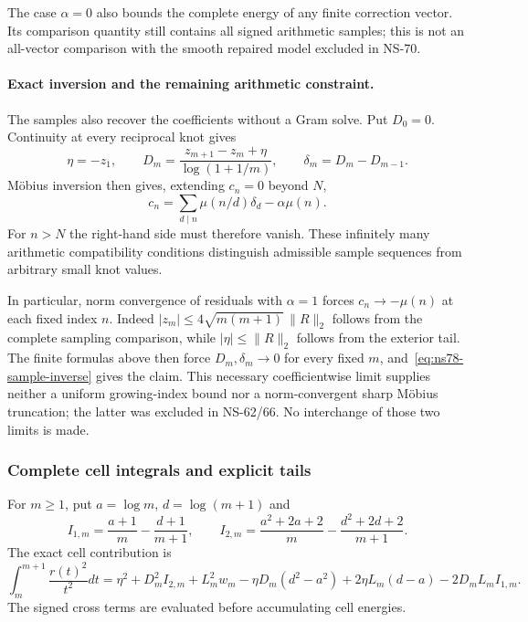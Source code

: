 \documentclass[11pt]{article}
\theoremstyle{remark}
\begin{document}
The case $\alpha=0$ also bounds the complete energy of any finite
correction vector. Its comparison quantity still contains all signed
arithmetic samples; this is not an all-vector comparison with the
smooth repaired model excluded in NS-70.

\paragraph{Exact inversion and the remaining arithmetic constraint.}
The samples also recover the coefficients without a Gram solve. Put
$D_0=0$. Continuity at every reciprocal knot gives
\[
 \eta=-z_1,\qquad
 D_m=\frac{z_{m+1}-z_m+\eta}{\log(1+1/m)},\qquad
 \delta_m=D_m-D_{m-1}.
\]
M\"obius inversion then gives, extending $c_n=0$ beyond $N$,
\begin{equation}
 c_n=\sum_{d\mid n}\mu(n/d)\delta_d-\alpha\mu(n).
 \label{eq:ns78-sample-inverse}
\end{equation}
For $n>N$ the right-hand side must therefore vanish. These infinitely
many arithmetic compatibility conditions distinguish admissible sample
sequences from arbitrary small knot values.

In particular, norm convergence of residuals with $\alpha=1$ forces
$c_n\to-\mu(n)$ at each fixed index $n$. Indeed
$|z_m|\leq4\sqrt{m(m+1)}\,\|R\|_2$ follows from the complete
sampling comparison, while $|\eta|\leq\|R\|_2$ follows from the
exterior tail. The finite formulas above then force $D_m,\delta_m\to0$
for every fixed $m$, and~\eqref{eq:ns78-sample-inverse} gives the claim.
This necessary coefficientwise limit supplies neither a uniform growing-index
bound nor a norm-convergent sharp M\"obius truncation; the latter was
excluded in NS-62/66. No interchange of those two limits is made.

\subsubsection{Complete cell integrals and explicit tails}
\label{subsec:ns78-tails}
For $m\geq1$, put $a=\log m$, $d=\log(m+1)$ and
\[
 I_{1,m}=\frac{a+1}{m}-\frac{d+1}{m+1},\qquad
 I_{2,m}=\frac{a^2+2a+2}{m}-\frac{d^2+2d+2}{m+1}.
\]
The exact cell contribution is
\begin{equation}
 \int_m^{m+1}\frac{r(t)^2}{t^2}dt
 =\eta^2+D_m^2I_{2,m}+L_m^2w_m
 -\eta D_m(d^2-a^2)+2\eta L_m(d-a)-2D_mL_mI_{1,m}.
 \label{eq:ns78-exact-cell}
\end{equation}
The signed cross terms are evaluated before accumulating cell energies.
\end{document}
